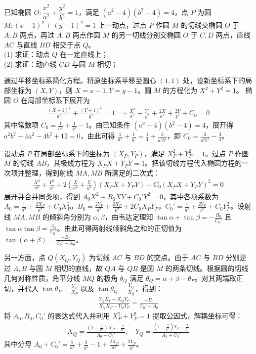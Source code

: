 \begin{exercise}
已知椭圆 \( O: \dfrac{x^2}{a^2} + \dfrac{y^2}{b^2} = 1 \)，满足 \( (a^2 - 4)(b^2 - 4) = 4 \)，点 \( P \) 为圆 \( M: (x-1)^2 + (y-1)^2 = 1 \) 上一动点，过点 \( P \) 作圆 \( M \) 的切线交椭圆 \( O \) 于 \( A,B \) 两点，再过 \( A,B \) 两点作圆 \( M \) 的另一切线分别交椭圆 \( O \) 于 \( C,D \) 两点，直线 \( AC \) 与直线 \( BD \) 相交于点 \( Q \)。\\
(1) 求证：动点 \( Q \) 在一定直线上；\\
(2) 求证：动直线 \( CD \) 与圆 \( M \) 相切；
\end{exercise}
\begin{solution}
通过平移坐标系简化方程。将原坐标系平移至圆心 $(1,1)$ 处，设新坐标系下的局部坐标为 $(X,Y)$，则 $X = x-1, Y = y-1$。圆 $M$ 的方程化为 $X^2 + Y^2 = 1$。
椭圆 $O$ 在局部坐标系下展开为
\begin{align*}
\frac{(X+1)^2}{a^2} + \frac{(Y+1)^2}{b^2} = 1 \implies \frac{X^2}{a^2} + \frac{Y^2}{b^2} + \frac{2X}{a^2} + \frac{2Y}{b^2} + C_0 = 0
\end{align*}
其中常数项 $C_0 = \frac{1}{a^2} + \frac{1}{b^2} - 1$。由已知条件 $(a^2-4)(b^2-4)=4$，展开得 $a^2b^2 - 4a^2 - 4b^2 + 12 = 0$，由此可得 $\frac{1}{a^2} + \frac{1}{b^2} = \frac{1}{4} + \frac{3}{a^2b^2}$，即 $C_0 = \frac{3}{a^2b^2} - \frac{3}{4}$。

设动点 $P$ 在局部坐标系下的坐标为 $(X_P, Y_P)$，满足 $X_P^2 + Y_P^2 = 1$。过点 $P$ 作圆 $M$ 的切线 $AB$，其极线方程为 $X_P X + Y_P Y = 1$。把该切线方程代入椭圆方程的一次项并整理，得到射线 $MA, MB$ 所满足的二次式：
\begin{align*}
\frac{X^2}{a^2} + \frac{Y^2}{b^2} + 2\left(\frac{X}{a^2} + \frac{Y}{b^2}\right)(X_P X + Y_P Y) + C_0(X_P X + Y_P Y)^2 = 0
\end{align*}
展开并合并同类项，得到 $A_0 X^2 + B_0 XY + C_0' Y^2 = 0$，其中各项系数为 $A_0 = \frac{1}{a^2} + \frac{2X_P}{a^2} + C_0 X_P^2$，$B_0 = \frac{2Y_P}{a^2} + \frac{2X_P}{b^2} + 2C_0 X_P Y_P$，$C_0' = \frac{1}{b^2} + \frac{2Y_P}{b^2} + C_0 Y_P^2$。设射线 $MA, MB$ 的倾斜角分别为 $\alpha, \beta$，由韦达定理知 $\tan\alpha + \tan\beta = -\frac{B_0}{C_0'}$ 且 $\tan\alpha \tan\beta = \frac{A_0}{C_0'}$。由此可得两射线倾斜角之和的正切值为 $\tan(\alpha + \beta) = \frac{-B_0}{C_0' - A_0}$。

另一方面，点 $Q(X_Q, Y_Q)$ 为切线 $AC$ 与 $BD$ 的交点。由于 $AC$ 与 $BD$ 分别是过 $A,B$ 与圆 $M$ 相切的直线，故 $QA$ 与 $QB$ 是圆 $M$ 的两条切线。根据圆的切线几何对称性质，角平分线 $MQ$ 的极角 $\theta_Q$ 满足 $\theta_Q = \alpha + \beta - \theta_P$。对其两端取正切，并代入 $\tan\theta_P = \frac{Y_P}{X_P}$ 以及 $\tan\theta_Q = \frac{Y_Q}{X_Q}$，得到：
\begin{align*}
\frac{Y_Q X_P + X_Q Y_P}{X_Q X_P - Y_Q Y_P} = \frac{-B_0}{C_0' - A_0}
\end{align*}
将 $A_0, B_0, C_0'$ 的表达式代入并利用 $X_P^2 + Y_P^2 = 1$ 提取公因式，解耦坐标可得：
\begin{align*}
X_Q = \frac{\left(1 - \frac{2}{a^2}\right)X_P - \frac{2}{a^2}}{A_0 + C_0'}, \quad Y_Q = \frac{\left(1 - \frac{2}{b^2}\right)Y_P - \frac{2}{b^2}}{A_0 + C_0'}
\end{align*}
其中分母 $A_0 + C_0' = \frac{2}{a^2} + \frac{2}{b^2} - 1 + \frac{2X_P}{a^2} + \frac{2Y_P}{b^2}$。


\end{solution}
